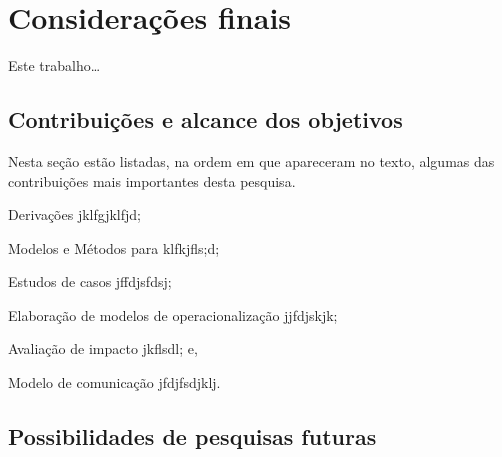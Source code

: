 %
%

\chapter{Considerações finais}\label{cap_conclusao}

Este trabalho\ldots

\section{Contribuições e alcance dos objetivos}
\label{conclusao_contribuicoes}

Nesta seção estão listadas, na ordem em que apareceram no texto, algumas das
contribuições mais importantes desta pesquisa.

\begin{list}{--}{}

    \item Derivações jklfgjklfjd;

    \item Modelos e Métodos para klfkjfls;d;

    \item Estudos de casos jffdjsfdsj;

    \item Elaboração de modelos de operacionalização jjfdjskjk;

    \item Avaliação de impacto jkflsdl; e,

    \item Modelo de comunicação jfdjfsdjklj.

\end{list}

\section{Possibilidades de pesquisas futuras}\label{conclusaoTrabalhosFuturos}


